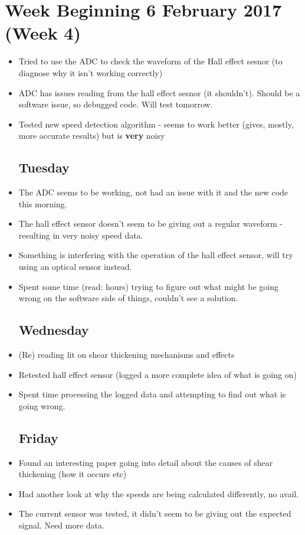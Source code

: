 \documentclass[a4]{report}
\begin{document}
	\section{Week Beginning 6 February 2017 (Week 4)}
	\begin{itemize}
		\subsection*{Monday}
		\item Tried to use the ADC to check the waveform of the Hall effect sesnor (to diagnose why it isn't working correctly)
		\item ADC has issues reading from the hall effect sesnor (it shouldn't). Should be a software issue, so debugged code. Will test tomorrow.
		\item Tested new speed detection algorithm - seems to work better (gives, mostly, more accurate results) but is \textbf{very} noisy
		\subsection*{Tuesday}
		\item The ADC seems to be working, not had an issue with it and the new code this morning.
		\item The hall effect sensor doesn't seem to be giving out a regular waveform - resulting in very noisy speed data.
		\item Something is interfering with the operation of the hall effect sensor, will try using an optical sensor instead.
		\item Spent some time (read: hours) trying to figure out what might be going wrong on the software side of things, couldn't see a solution.
		\subsection*{Wednesday}
		\item (Re) reading lit on shear thickening mechanisms and effects
		\item Retested hall effect sensor (logged a more complete idea of what is going on) 
		\item Spent time processing the logged data and attempting to find out what is going wrong.
		\subsection*{Friday}
		\item Found an interesting paper going into detail about the causes of shear thickening (how it occurs etc)
		\item Had another look at why the speeds are being calculated differently, no avail.
		\item The current sensor was tested, it didn't seem to be giving out the expected signal. Need more data.
	\end{itemize}
	\newpage
\end{document}
